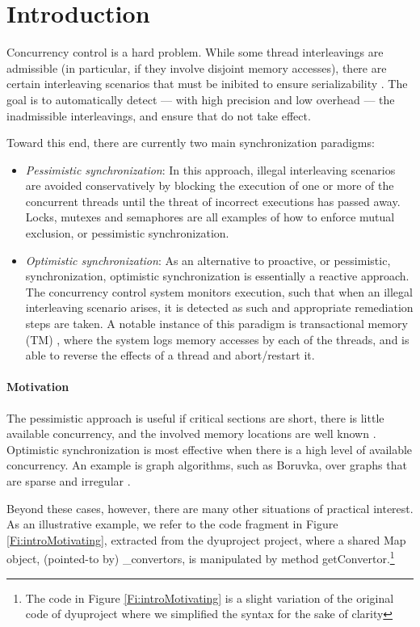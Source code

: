 \section{Introduction}

Concurrency control is a hard problem. While some thread interleavings are admissible (in particular, if they involve disjoint memory accesses), there are certain interleaving scenarios that must be inibited to ensure serializability \cite{Serializability}. The goal is to automatically detect --- with high precision and low overhead --- the inadmissible interleavings, and ensure that do not take effect.  

Toward this end, there are currently two main synchronization paradigms:
\begin{itemize}
	\item \textit{Pessimistic synchronization}: In this approach, illegal interleaving scenarios are avoided conservatively by blocking the execution of one or more of the concurrent threads until the threat of incorrect executions has passed away. Locks, mutexes and semaphores are all examples of how to enforce mutual exclusion, or pessimistic synchronization.
	\item \textit{Optimistic synchronization}: As an alternative to proactive, or pessimistic, synchronization, optimistic synchronization is essentially a reactive approach. The concurrency control system monitors execution, such that when an illegal interleaving scenario arises, it is detected as such and appropriate remediation steps are taken. A notable instance of this paradigm is transactional memory (TM) \cite{DBLP:conf/isca/HerlihyM93}, where the system logs memory accesses by each of the threads, and is able to reverse the effects of a thread and abort/restart it.
\end{itemize}

\paragraph{Motivation} The pessimistic approach is useful if critical sections are short, there is little available concurrency, and the involved memory locations are well known \cite{AndiKleen}. Optimistic synchronization is most effective when there is a high level of available concurrency. An example is graph algorithms, such as Boruvka, over graphs that are sparse and irregular \cite{KulkarniGalois}.

Beyond these cases, however, there are many other situations of practical interest. As an illustrative example, we refer to the code fragment in Figure \ref{Fi:introMotivating}, extracted from the {\sf dyuproject} project, where a shared {\sf Map} object, (pointed-to by) {\sf \_convertors}, is manipulated by method {\sf getConvertor}.\footnote{The code in Figure \ref{Fi:introMotivating} is a slight variation of the original code of {\sf dyuproject} where we simplified the syntax for the sake of clarity}

